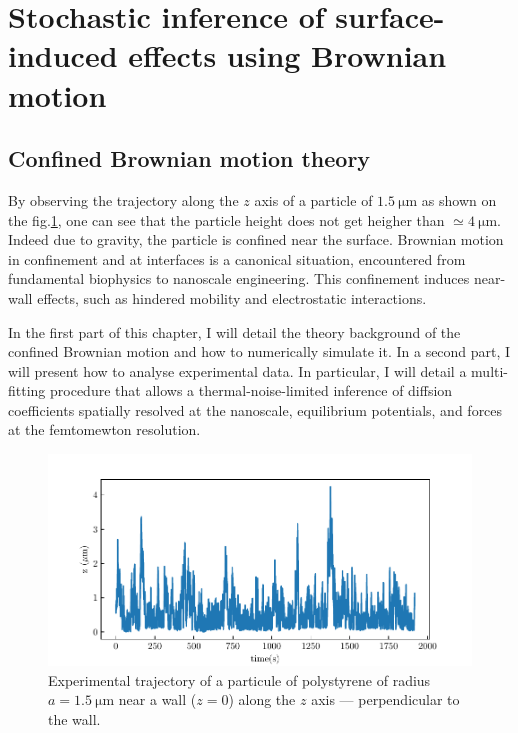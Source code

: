 \section{Stochastic inference of surface-induced effects using Brownian motion}

\subsection{Confined Brownian motion theory}

By observing the trajectory along the $z$ axis of a particle of $1.5 ~ \mathrm{\mu m} $ as shown on the fig.\ref{Fig:exp_z_traj}, one can see that the particle height does not get heigher than $ \simeq 4 ~ \mathrm{\mu m}$. Indeed due to gravity, the particle is confined near the surface. Brownian motion in confinement and at interfaces is a canonical situation, encountered from fundamental biophysics  to  nanoscale  engineering. This confinement induces near-wall effects, such as hindered mobility and electrostatic interactions. 

In the first part of this chapter, I will detail the theory background of the confined Brownian motion and how to numerically simulate it. In a second part, I will present how to analyse experimental data. In particular, I will detail a multi-fitting procedure that allows a thermal-noise-limited inference of diffsion coefficients spatially resolved at the nanoscale, equilibrium potentials, and forces at the femtomewton resolution.

\begin{figure}[ht]
	\centering
	\includegraphics{02_body/chapter3/images/traj_z/traj_z.pdf}
	\caption{Experimental trajectory of a particule of polystyrene of radius $a = 1.5 ~ \mathrm{\mu m}$ near a wall ($z = 0$) along the $z$ axis --- perpendicular to the wall.}
	\label{Fig:exp_z_traj}
\end{figure}

